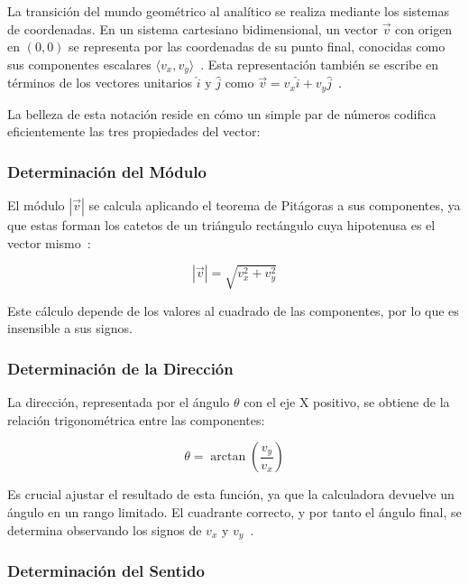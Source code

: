 \documentclass[12pt,a4paper]{article}
\begin{document}
La transición del mundo geométrico al analítico se realiza mediante los sistemas de coordenadas. En un sistema cartesiano bidimensional, un vector $\vec{v}$ con origen en $(0,0)$ se representa por las coordenadas de su punto final, conocidas como sus componentes escalares $\langle v_x, v_y \rangle$~\cite{openstax_fisica}. Esta representación también se escribe en términos de los vectores unitarios $\hat{i}$ y $\hat{j}$ como $\vec{v} = v_x \hat{i} + v_y \hat{j}$~\cite{serway2008}.

La belleza de esta notación reside en cómo un simple par de números codifica eficientemente las tres propiedades del vector:

\subsubsection{Determinación del Módulo} \label{subsubsec:modulo}

El módulo $|\vec{v}|$ se calcula aplicando el teorema de Pitágoras a sus componentes, ya que estas forman los catetos de un triángulo rectángulo cuya hipotenusa es el vector mismo~\cite{grossman2012}:

\begin{equation}
|\vec{v}| = \sqrt{v_x^2 + v_y^2}
\end{equation}

Este cálculo depende de los valores al cuadrado de las componentes, por lo que es insensible a sus signos.

\subsubsection{Determinación de la Dirección} \label{subsubsec:dir_calc}

La dirección, representada por el ángulo $\theta$ con el eje X positivo, se obtiene de la relación trigonométrica entre las componentes:

\begin{equation}
\theta = \arctan\left(\frac{v_y}{v_x}\right)
\end{equation}

Es crucial ajustar el resultado de esta función, ya que la calculadora devuelve un ángulo en un rango limitado. El cuadrante correcto, y por tanto el ángulo final, se determina observando los signos de $v_x$ y $v_y$~\cite{openstax_fisica}.

\subsubsection{Determinación del Sentido} \label{subsubsec:sent_calc}
\end{document}
